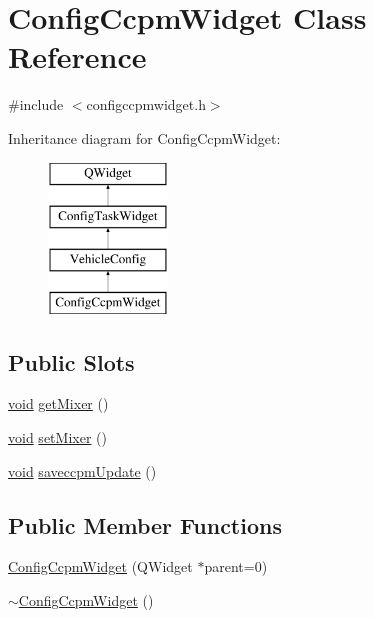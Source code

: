 \hypertarget{class_config_ccpm_widget}{\section{Config\-Ccpm\-Widget Class Reference}
\label{class_config_ccpm_widget}
}


{\ttfamily \#include $<$configccpmwidget.\-h$>$}

Inheritance diagram for Config\-Ccpm\-Widget\-:\begin{figure}[H]
\begin{center}
\leavevmode
\includegraphics[height=4.000000cm]{class_config_ccpm_widget}
\end{center}
\end{figure}
\subsection*{Public Slots}
\begin{DoxyCompactItemize}
\item 
\hyperlink{group___u_a_v_objects_plugin_ga444cf2ff3f0ecbe028adce838d373f5c}{void} \hyperlink{group___config_plugin_ga655f5771884dcc4da79423c9f233ccca}{get\-Mixer} ()
\item 
\hyperlink{group___u_a_v_objects_plugin_ga444cf2ff3f0ecbe028adce838d373f5c}{void} \hyperlink{group___config_plugin_gabc1d25c95203b38337f954ed47387039}{set\-Mixer} ()
\item 
\hyperlink{group___u_a_v_objects_plugin_ga444cf2ff3f0ecbe028adce838d373f5c}{void} \hyperlink{group___config_plugin_ga58b70d2303d5485482abdd35f2f49c15}{saveccpm\-Update} ()
\end{DoxyCompactItemize}
\subsection*{Public Member Functions}
\begin{DoxyCompactItemize}
\item 
\hyperlink{group___config_plugin_gad02f1999c6fe879b07303698416ff782}{Config\-Ccpm\-Widget} (Q\-Widget $\ast$parent=0)
\item 
\hyperlink{group___config_plugin_ga1c115c3e78572da9895bc485b6ed507e}{$\sim$\-Config\-Ccpm\-Widget} ()
\end{DoxyCompactItemize}
